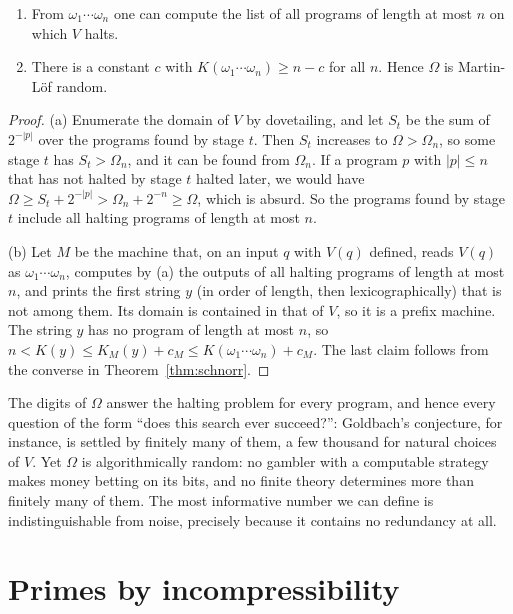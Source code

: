 \begin{theorem}[Chaitin 1975]\label{thm:omega}
\begin{enumerate}[label=(\alph*)]
\item From $\omega_1\cdots\omega_n$ one can compute the list of all programs of length at most $n$ on which $V$ halts.
\item There is a constant $c$ with $K(\omega_1\cdots\omega_n)\ge n-c$ for all $n$. Hence $\Omega$ is Martin-Löf random.
\end{enumerate}
\end{theorem}

\begin{proof}
(a) Enumerate the domain of $V$ by dovetailing, and let $S_t$ be the sum of $2^{-|p|}$ over the programs found by stage $t$. Then $S_t$ increases to $\Omega>\Omega_n$, so some stage $t$ has $S_t>\Omega_n$, and it can be found from $\Omega_n$. If a program $p$ with $|p|\le n$ that has not halted by stage $t$ halted later, we would have $\Omega\ge S_t+2^{-|p|}>\Omega_n+2^{-n}\ge\Omega$, which is absurd. So the programs found by stage $t$ include all halting programs of length at most $n$.

(b) Let $M$ be the machine that, on an input $q$ with $V(q)$ defined, reads $V(q)$ as $\omega_1\cdots\omega_n$, computes by (a) the outputs of all halting programs of length at most $n$, and prints the first string $y$ (in order of length, then lexicographically) that is not among them. Its domain is contained in that of $V$, so it is a prefix machine. The string $y$ has no program of length at most $n$, so $n<K(y)\le K_M(y)+c_M\le K(\omega_1\cdots\omega_n)+c_M$. The last claim follows from the converse in Theorem~\ref{thm:schnorr}.
\end{proof}

\begin{beauty}
The digits of $\Omega$ answer the halting problem for every program, and hence every question of the form ``does this search ever succeed?'': Goldbach's conjecture, for instance, is settled by finitely many of them, a few thousand for natural choices of $V$. Yet $\Omega$ is algorithmically random: no gambler with a computable strategy makes money betting on its bits, and no finite theory determines more than finitely many of them. The most informative number we can define is indistinguishable from noise, precisely because it contains no redundancy at all.
\end{beauty}

\section{Primes by incompressibility}\label{sec:primes}

